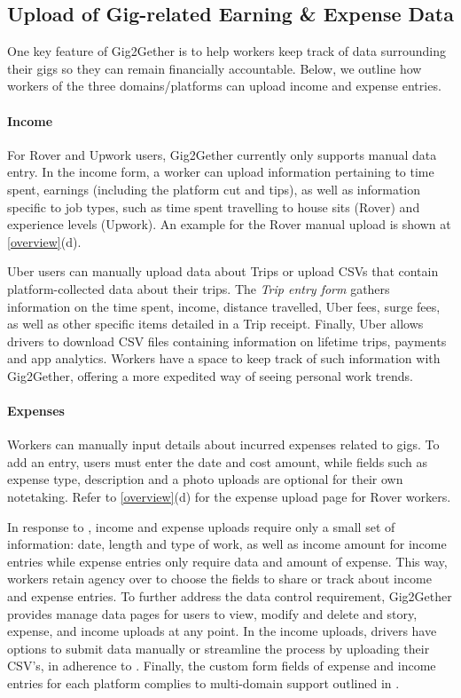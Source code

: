 \subsection{Upload of Gig-related Earning \& Expense Data}
\label{upload}
One key feature of Gig2Gether is to help workers keep track of data surrounding their gigs so they can remain financially accountable. Below, we outline how workers of the three domains/platforms can upload income and expense entries. 

\paragraph{Income} 
For Rover and Upwork users, Gig2Gether currently only supports manual data entry. 
In the income form, a worker can upload information pertaining to time spent, earnings (including the platform cut and tips), as well as information specific to job types, such as time spent travelling to house sits (Rover) and experience levels (Upwork). 
An example for the Rover manual upload is shown at \ref{overview}(d).

\vspace{\baselineskip}

Uber users can manually upload data about Trips or upload CSVs that contain platform-collected data about their trips.
The \textit{Trip entry form} gathers information on the time spent, income, distance travelled, Uber fees, surge fees, as well as other specific items detailed in a Trip receipt. 
Finally, Uber allows drivers to download CSV files containing information on lifetime trips, payments and app analytics. Workers have a space to keep track of such information with Gig2Gether, offering a more expedited way of seeing personal work trends.


\paragraph{Expenses} Workers can manually input details about
incurred expenses related to gigs. To add an entry, users must enter the date and cost amount, while fields such as expense type, description and a photo uploads are optional for their own notetaking. Refer to \ref{overview}(d) for the expense upload page for Rover workers.

\vspace{\baselineskip}

In response to , income and expense uploads require only a small set of information: date, length and type of work, as well as income amount for income entries while expense entries only require data and amount of expense.
This way, workers retain agency over to choose the fields to share or track about income and expense entries. To further address the data control requirement, Gig2Gether provides manage data pages for users to view, modify and delete and story, expense, and income uploads at any point. 
In the income uploads, drivers have options to submit data manually or streamline the process by uploading their CSV's, in adherence to . Finally, the custom form fields of expense and income entries for each platform complies to multi-domain support outlined in .
    
